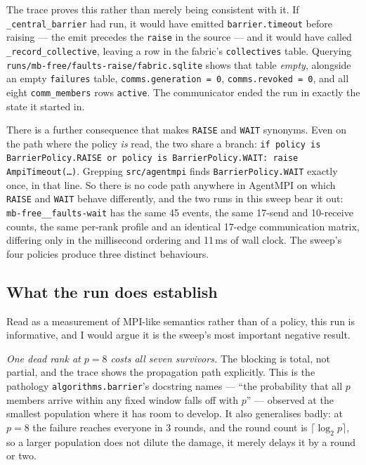 \documentclass[11pt]{article}
\begin{document}
The trace proves this rather than merely being consistent with it. If
\texttt{\_central\_barrier} had run, it would have emitted \texttt{barrier.timeout} before
raising --- the emit precedes the \texttt{raise} in the source --- and it would have
called \texttt{\_record\_collective}, leaving a row in the fabric's \texttt{collectives}
table. Querying \texttt{runs/mb-free/faults-raise/fabric.sqlite} shows that table
\emph{empty}, alongside an empty \texttt{failures} table,
\texttt{comms.generation = 0}, \texttt{comms.revoked = 0}, and all eight
\texttt{comm\_members} rows \texttt{active}. The communicator ended the run in exactly the
state it started in.

There is a further consequence that makes \texttt{RAISE} and \texttt{WAIT} synonyms.
Even on the path where the policy \emph{is} read, the two share a branch:
\texttt{if policy is BarrierPolicy.RAISE or policy is BarrierPolicy.WAIT: raise
AmpiTimeout(\ldots)}. Grepping \texttt{src/agentmpi} finds
\texttt{BarrierPolicy.WAIT} exactly once, in that line. So there is no code path anywhere
in AgentMPI on which \texttt{RAISE} and \texttt{WAIT} behave differently, and the two runs
in this sweep bear it out: \texttt{mb-free\_\_faults-wait} has the same 45 events, the same
17-send and 10-receive counts, the same per-rank profile and an identical 17-edge
communication matrix, differing only in the millisecond ordering and 11\,ms of wall clock.
The sweep's four policies produce three distinct behaviours.

\subsection{What the run does establish}

Read as a measurement of MPI-like semantics rather than of a policy, this run is
informative, and I would argue it is the sweep's most important negative result.

\emph{One dead rank at $p=8$ costs all seven survivors.} The blocking is total, not
partial, and the trace shows the propagation path explicitly. This is the pathology
\texttt{algorithms.barrier}'s docstring names --- ``the probability that all $p$ members
arrive within any fixed window falls off with $p$'' --- observed at the smallest
population where it has room to develop. It also generalises badly: at $p=8$ the failure
reaches everyone in 3 rounds, and the round count is $\lceil \log_2 p \rceil$, so a larger
population does not dilute the damage, it merely delays it by a round or two.
\end{document}
